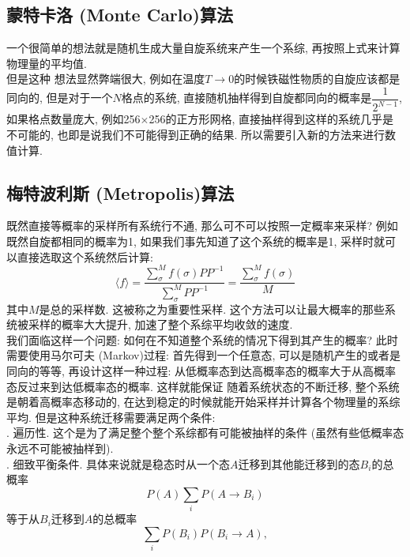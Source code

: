 \documentclass[UTF8]{ctexart}
\begin{document}
        \subsection{蒙特卡洛 (Monte Carlo)算法}
            \indent 一个很简单的想法就是随机生成大量自旋系统来产生一个系综, 再按照上式来计算物理量的平均值.\\
            \indent 但是这种    想法显然弊端很大, 例如在温度$T\rightarrow 0$的时候铁磁性物质的自旋应该都是同向的, 但是对于一个$N$格点的系统,
            直接随机抽样得到自旋都同向的概率是$\dfrac{1}{2^{N-1}}$, 如果格点数量庞大, 例如256$\times$256的正方形网格, 直接抽样得到这样的系统几乎是不可能的,
            也即是说我们不可能得到正确的结果. 所以需要引入新的方法来进行数值计算.
        \subsection{梅特波利斯 (Metropolis)算法}
            \indent 既然直接等概率的采样所有系统行不通, 那么可不可以按照一定概率来采样? 例如既然自旋都相同的概率为1, 如果我们事先知道了这个系统的概率是1,
            采样时就可以直接选取这个系统然后计算:
            \begin{equation}
                \langle f\rangle=\dfrac{\sum\limits_\sigma^M f(\sigma)PP^{-1}}{\sum\limits_\sigma^M PP^{-1}}=\dfrac{\sum\limits_\sigma^M f(\sigma)}{M}
            \end{equation}
            其中$M$是总的采样数. 这被称之为重要性采样. 这个方法可以让最大概率的那些系统被采样的概率大大提升, 加速了整个系综平均收敛的速度.\\
            \indent 我们面临这样一个问题: 如何在不知道整个系统的情况下得到其产生的概率? 此时需要使用马尔可夫 (Markov)过程: 首先得到一个任意态,
            可以是随机产生的或者是同向的等等, 再设计这样一种过程: 从低概率态到达高概率态的概率大于从高概率态反过来到达低概率态的概率. 这样就能保证
            随着系统状态的不断迁移, 整个系统是朝着高概率态移动的, 在达到稳定的时候就能开始采样并计算各个物理量的系综平均. 但是这种系统迁移需要满足两个条件:\\
            . 遍历性. 这个是为了满足整个整个系综都有可能被抽样的条件 (虽然有些低概率态永远不可能被抽样到).\\
            . 细致平衡条件. 具体来说就是稳态时从一个态$A$迁移到其他能迁移到的态$B_i$的总概率
            \begin{equation}
                P(A)\sum\limits_iP(A\rightarrow B_i)
            \end{equation}
            等于从$B_i$迁移到$A$的总概率
            \begin{equation}
                \sum\limits_iP(B_i)P(B_i\rightarrow A),
            \end{equation}
\end{document}

